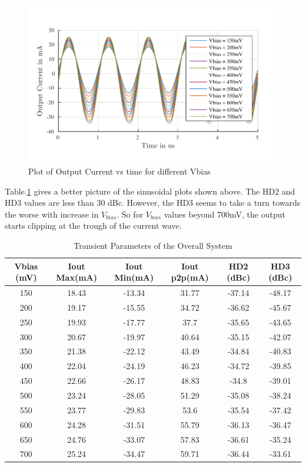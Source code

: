 \begin{figure} [H]
\centering
\includegraphics[scale=1]{Figures/Plots/Ov_Sine_Iout.pdf}
\caption{Plot of Output Current vs time for different Vbias}
\label{fig:SINE}
\end{figure}

Table.\ref{tab:SINE} gives a better picture of the sinusoidal plots shown above. The HD2 and HD3 values are less than 30 dBc. However, the HD3 seems to take a turn towards the worse with increase in $V_{bias}$. So for $V_{bias}$ values beyond 700mV, the output starts clipping at the trough of the current wave.

\begin{table} [H]
\centering
\begin{tabular}{@{}cccccc@{}}
\toprule
Vbias (mV)		& Iout Max(mA)		& Iout Min(mA)	 & Iout p2p(mA) & HD2 (dBc)	&HD3 (dBc) \\ \midrule
150				& 18.43	 			& -13.34		 & 31.77		& -37.14		& -48.17	\\
200				& 19.17 			& -15.55		 & 34.72		& -36.62		& -45.67	\\
250				& 19.93 			& -17.77		 & 37.7			& -35.65		& -43.65	\\
300				& 20.67 			& -19.97		 & 40.64		& -35.15		& -42.07	\\
350				& 21.38				& -22.12		 & 43.49		& -34.84		& -40.83	\\
400				& 22.04				& -24.19		 & 46.23		& -34.72		& -39.85	\\
450				& 22.66 			& -26.17		 & 48.83		& -34.8			& -39.01	\\
500				& 23.24				& -28.05		 & 51.29		& -35.08		& -38.24	\\
550				& 23.77	 			& -29.83		 & 53.6			& -35.54		& -37.42	\\
600				& 24.28 			& -31.51		 & 55.79		& -36.13		& -36.47	\\
650				& 24.76 			& -33.07		 & 57.83		& -36.61		& -35.24	\\
700 			& 25.24 			& -34.47		 & 59.71		& -36.44		& -33.61	\\
\bottomrule
\end{tabular}
\caption{Transient Parameters of the Overall System}
\label{tab:SINE}
\end{table}


